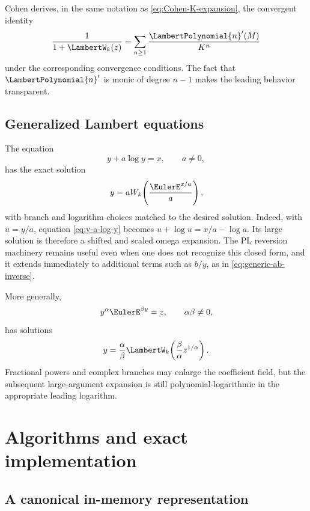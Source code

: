 \documentclass[11pt,oneside]{article}
\numberwithin{equation}{section}
\theoremstyle{definition}
\begin{document}
Cohen derives, in the same notation as \eqref{eq:Cohen-K-expansion}, the
convergent identity
\begin{equation}\label{eq:W-denominator-Ln}
  \frac{1}{1+\LambertW_k(z)}
  =\sum_{n\ge1}\frac{\LambertPolynomial{n}'(M)}{K^n}
\end{equation}
under the corresponding convergence conditions.  The fact that \(\LambertPolynomial{n}'\) is
monic of degree \(n-1\) makes the leading behavior transparent.

\subsection{Generalized Lambert equations}

The equation
\begin{equation}\label{eq:y-a-log-y}
  y+a\log y=x,
  \qquad a\ne0,
\end{equation}
has the exact solution
\begin{equation}\label{eq:y-a-log-y-solution}
  y=aW_k\!\left(\frac{\EulerE^{x/a}}{a}\right),
\end{equation}
with branch and logarithm choices matched to the desired solution.  Indeed, with
\(u=y/a\), equation \eqref{eq:y-a-log-y} becomes
\(u+\log u=x/a-\log a\).  Its large solution is therefore a shifted and scaled
omega expansion.  The PL reversion machinery remains useful even when one does
not recognize this closed form, and it extends immediately to additional terms
such as \(b/y\), as in \eqref{eq:generic-ab-inverse}.

More generally,
\begin{equation}\label{eq:power-exponential-equation}
  y^\alpha \EulerE^{\beta y}=z,
  \qquad \alpha\beta\ne0,
\end{equation}
has solutions
\begin{equation}\label{eq:power-exponential-solution}
  y=\frac{\alpha}{\beta}
  \LambertW_k\!\left(\frac{\beta}{\alpha}z^{1/\alpha}\right).
\end{equation}
Fractional powers and complex branches may enlarge the coefficient field, but
the subsequent large-argument expansion is still polynomial-logarithmic in the
appropriate leading logarithm.

\section{Algorithms and exact implementation}\label{sec:implementation}

\subsection{A canonical in-memory representation}
\end{document}
